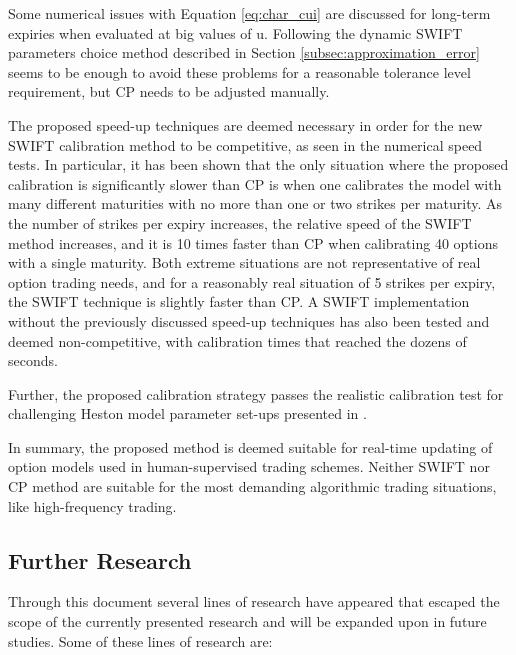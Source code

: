 \documentclass[12,twoside]{mammeTFM}
\theoremstyle{definition}
\theoremstyle{remark}
\begin{document}
Some numerical issues with Equation \ref{eq:char_cui} are discussed for long-term expiries when evaluated at big values of u. Following the dynamic SWIFT parameters choice method described in Section \ref{subsec:approximation_error} seems to be enough to avoid these problems for a reasonable tolerance level requirement, but CP needs to be adjusted manually.

The proposed speed-up techniques are deemed necessary in order for the new SWIFT calibration method to be competitive, as seen in the numerical speed tests. In particular, it has been shown that the only situation where the proposed calibration is significantly slower than CP is when one calibrates the model with many different maturities with no more than one or two strikes per maturity. As the number of strikes per expiry increases, the relative speed of the SWIFT method increases, and it is 10 times faster than CP when calibrating 40 options with a single maturity. Both extreme situations are not representative of real option trading needs, and for a reasonably real situation of 5 strikes per expiry, the SWIFT technique is slightly faster than CP. A SWIFT implementation without the previously discussed speed-up techniques has also been tested and deemed non-competitive, with calibration times that reached the dozens of seconds.

Further, the proposed calibration strategy passes the realistic calibration test for challenging Heston model parameter set-ups presented in \cite{cui17}.

In summary, the proposed method is deemed suitable for real-time updating of option models used in human-supervised trading schemes. Neither SWIFT nor CP method are suitable for the most demanding algorithmic trading situations, like high-frequency trading.

\subsection{Further Research}
Through this document several lines of research have appeared that escaped the scope of the currently presented research and will be expanded upon in future studies. Some of these lines of research are:
\end{document}
